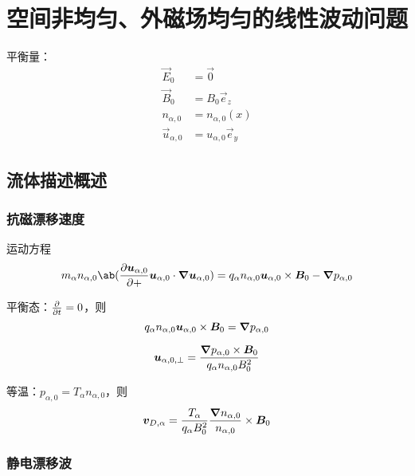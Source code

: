 
\chapter{空间非均匀、外磁场均匀的线性波动问题}

平衡量：
\begin{subequations}\begin{align}
\vec{E}_0 &= \vec{0} \\
\vec{B}_0 &= B_0 \vec{e}_z \\
n_{\alpha,0} &= n_{\alpha,0}(x) \\
\vec{u}_{\alpha,0} &= u_{\alpha,0} \vec{e}_y
\end{align}\end{subequations}

\section{流体描述概述}

\subsection{抗磁漂移速度}

运动方程
\begin{equation}
m_\alpha n_{\alpha,0} \ab(
    \pdv{\vec{u}_{\alpha,0}}
    + \vec{u}_{\alpha,0} \cdot \grad{\vec{u}_{\alpha,0}}
)
= q_\alpha n_{\alpha,0} \vec{u}_{\alpha,0} \times \vec{B}_0
- \grad{p_{\alpha,0}}
\end{equation}

平衡态：$\pdv{}{t} = 0$，则
\begin{equation}
q_\alpha n_{\alpha,0} \bm{u}_{\alpha,0} \times \bm{B}_0 = \bm{\nabla}{p_{\alpha,0}}
\end{equation}

\begin{equation}
\bm{u}_{\alpha,0,\perp} = \frac{
    \bm{\nabla}{p_{\alpha,0}} \times \bm{B}_0
}{q_\alpha n_{\alpha,0} B_0^2}
\end{equation}

等温：$p_{\alpha,0} = T_\alpha n_{\alpha,0}$，则
\begin{equation}
\bm{v}_{D,\alpha} = \frac{T_\alpha}{q_\alpha B_0^2}
\frac{\bm{\nabla}{n_{\alpha,0}}}{n_{\alpha,0}} \times \bm{B}_0
\end{equation}

\subsection{静电漂移波}

